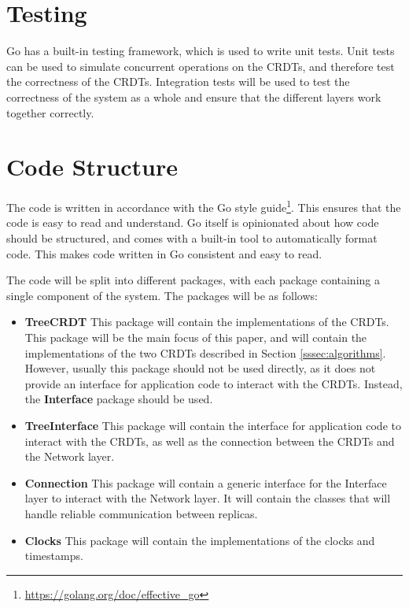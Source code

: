 \documentclass[12pt]{report}
\begin{document}
\section{Testing}
Go has a built-in testing framework, which is used to write unit tests. Unit tests can be used to simulate concurrent operations on the CRDTs, and therefore test the correctness of the CRDTs. Integration tests will be used to test the correctness of the system as a whole and ensure that the different layers work together correctly. \par


\section{Code Structure}\label{sec:code_structure}
The code is written in accordance with the Go style guide\footnote{\url{https://golang.org/doc/effective\_go}}. This ensures that the code is easy to read and understand. Go itself is opinionated about how code should be structured, and comes with a built-in tool to automatically format code. This makes code written in Go consistent and easy to read. \par

The code will be split into different packages, with each package containing a single component of the system. The packages will be as follows:
\begin{itemize}
    \item \textbf{TreeCRDT} This package will contain the implementations of the CRDTs. This package will be the main focus of this paper, and will contain the implementations of the two CRDTs described in Section \ref{sssec:algorithms}. However, usually this package should not be used directly, as it does not provide an interface for application code to interact with the CRDTs. Instead, the \textbf{Interface} package should be used. 
    \item \textbf{TreeInterface} This package will contain the interface for application code to interact with the CRDTs, as well as the connection between the CRDTs and the Network layer.
    \item \textbf{Connection} This package will contain a generic interface for the Interface layer to interact with the Network layer. It will contain the classes that will handle reliable communication between replicas.
    \item \textbf{Clocks} This package will contain the implementations of the clocks and timestamps.
\end{itemize}
\end{document}
